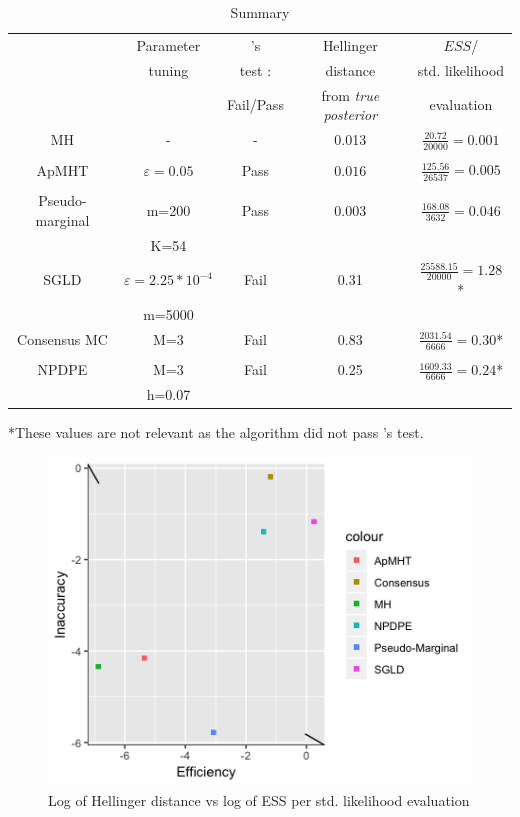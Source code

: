 \documentclass[11pt,a4paper]{report}\usepackage[]{graphicx}\usepackage[]{color}
\begin{document}
\begin{table}
    \centering
    \caption{Summary}
    \label{tab2}
    \begin{tabular}{ccccc}
\hline
&Parameter &\cite{geweke2004getting}'s & Hellinger & $ESS$/\\
&tuning&test :&distance&std. likelihood\\
&&  Fail/Pass &  from \textit{true posterior} &    evaluation\\

\hline
MH &-& - & 0.013 & $\frac{20.72}{20000}=0.001$ \\
&&&&\\
\hline
ApMHT &$\varepsilon=0.05$& Pass & $0.016$ & $\frac{125.56}{26537}=0.005$ \\
&&&&\\
\hline
Pseudo-marginal &m=200& Pass & $0.003$ &$\frac{168.08}{3632}=0.046$\\
&K=54&&&\\
\hline
SGLD &$\varepsilon=2.25*10^{-4}$& Fail &0.31&$\frac{25588.15}{20000}=1.28$*\\
&m=5000&&&\\
\hline
Consensus MC &M=3& Fail & 0.83 & $\frac{2031.54}{6666}=0.30$*\\
&&&&\\
\hline
NPDPE &M=3& Fail &0.25&$\frac{1609.33}{6666}=0.24$*\\
&h=0.07&&&\\
\hline
\end{tabular}
\small{*These values are not relevant as the algorithm did not pass \cite{geweke2004getting}'s test.}
\end{table}

\begin{figure}
\caption{Log of Hellinger distance vs log of ESS per std. likelihood evaluation}
\label{HD2}
\centering

  \includegraphics[resolution=110]{bimod_plots/bimod_HD_ESS.png}

\end{figure}
\end{document}
